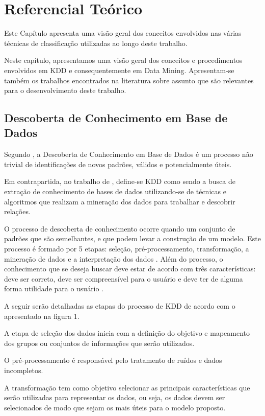 \documentclass[
	12pt,				%
	openright,			%
	oneside,	
	a4paper,				%
	english,				%
	brazil				%
]{abntex2/abntex2} %
\begin{document}
\chapter{Referencial Teórico}

Este Capítulo apresenta uma visão geral dos conceitos envolvidos nas várias técnicas de classificação utilizadas ao longo deste trabalho.

Neste capítulo, apresentamos uma visão geral dos conceitos e procedimentos envolvidos em KDD e consequentemente em Data Mining. Apresentam-se também os trabalhos encontrados na literatura sobre assunto que são relevantes para o desenvolvimento deste trabalho.

	\section{Descoberta de Conhecimento em Base de Dados}
	
	Segundo \cite{fayyad:1996}, a Descoberta de Conhecimento em Base de Dados é um processo não trivial de identificações de novos padrões, válidos e potencialmente úteis.
	
	Em contrapartida, no trabalho de \cite{thome:2002}, define-se KDD como sendo a busca de extração de conhecimento de bases de dados utilizando-se de técnicas e algoritmos que realizam a mineração dos dados para trabalhar e descobrir relações.
	
	O processo de descoberta de conhecimento ocorre quando um conjunto de padrões que são semelhantes, e que podem levar a construção de um modelo. Este processo é formado por 5 etapas: seleção, pré-processamento, transformação, a mineração de dados e a interpretação dos dados \cite{fayyad:1996}. Além do processo, o conhecimento que se deseja buscar deve estar de acordo com três características: deve ser correto, deve ser compreensível para o usuário e deve ter de alguma forma utilidade para o usuário \cite{freitas:2000}.
	
	A seguir serão detalhadas as etapas do processo de KDD de acordo com o apresentado na figura 1.
	
	A etapa de seleção dos dados inicia com a definição do objetivo e mapeamento  dos grupos ou conjuntos de informações que serão utilizados.
	
	O pré-processamento é responsável pelo tratamento de ruídos e dados incompletos.
	
	A transformação tem como objetivo selecionar as principais características que serão utilizadas para representar os dados, ou seja, os dados devem ser selecionados de  modo que sejam os mais úteis para o modelo proposto.
	
\end{document}
